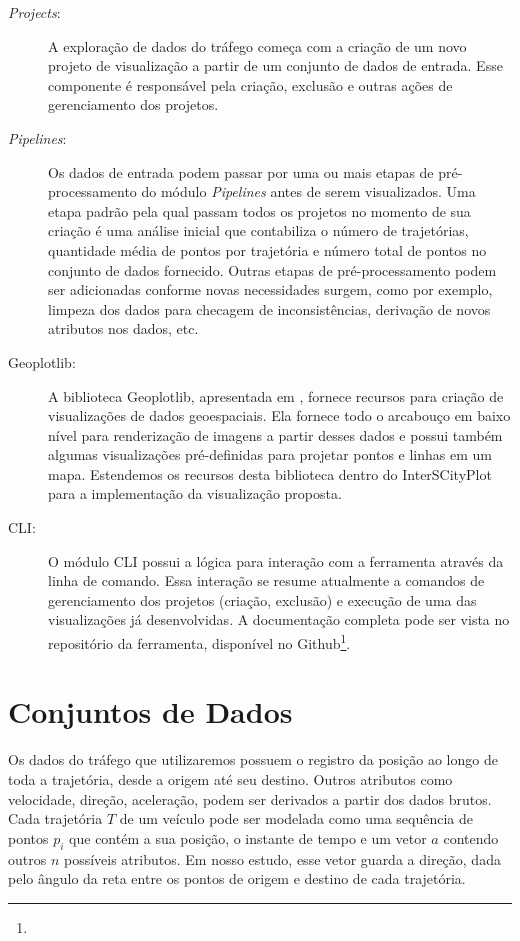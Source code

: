 \begin{description}
  \item[\emph{Projects}:] A exploração de dados do tráfego começa com a criação de um
novo projeto de visualização a partir de um conjunto de dados de entrada. Esse
componente é responsável pela criação, exclusão e outras ações de gerenciamento
dos projetos.

  \item[\emph{Pipelines}:] Os dados de entrada podem passar por uma ou mais
etapas de pré-processamento do módulo \emph{Pipelines} antes de serem
visualizados. Uma etapa padrão pela qual passam todos os projetos no momento de
sua criação é uma análise inicial que contabiliza o número de trajetórias,
quantidade média de pontos por trajetória e número total de pontos no conjunto
de dados fornecido. Outras etapas de pré-processamento podem ser adicionadas
conforme novas necessidades surgem, como por exemplo, limpeza dos dados para
checagem de inconsistências, derivação de novos atributos nos dados, etc.

  \item[Geoplotlib:] A biblioteca Geoplotlib, apresentada em
\citet{Andrea2016}, fornece recursos para criação de visualizações de dados
geoespaciais. Ela fornece todo o arcabouço em baixo nível para renderização de
imagens a partir desses dados e possui também algumas visualizações
pré-definidas para projetar pontos e linhas em um mapa.  Estendemos os recursos
desta biblioteca dentro do InterSCityPlot para a implementação da visualização
proposta.

  \item[CLI:] O módulo CLI possui a lógica para interação com a ferramenta
através da linha de comando. Essa interação se resume atualmente a comandos de
gerenciamento dos projetos (criação, exclusão) e execução de uma das
visualizações já desenvolvidas. A documentação completa pode ser vista no
repositório da ferramenta, disponível no
Github\footnote{}.

\end{description}

\section{Conjuntos de Dados}
   Os dados do tráfego que utilizaremos possuem o registro da posição ao longo
de toda a trajetória, desde a origem até seu destino. Outros atributos como velocidade,
direção, aceleração, podem ser derivados a partir dos dados brutos. Cada trajetória $T$ de um
veículo pode ser modelada como uma sequência de pontos $p_i$ que contém a sua
posição, o instante de tempo e um vetor $a$ contendo outros $n$ possíveis atributos. Em
nosso estudo, esse vetor guarda a direção, dada pelo ângulo da reta
entre os pontos de origem e destino de cada trajetória.

